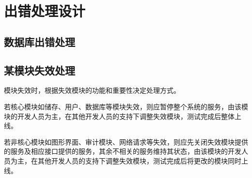\chapter{出错处理设计}
\section{数据库出错处理}

    

\section{某模块失效处理}
    模块失效时，根据失效模块的功能和重要性决定处理方式。

    若核心模块如储存、用户、数据库等模块失效，则应暂停整个系统的服务，由该模块的开发人员为主，在其他开发人员的支持下调整失效模块，测试完成后整体上线。

    若非核心模块如图形界面、审计模块、网络请求等失效，则应先关闭失效模块提供的服务及相应接口提供的服务，其余不相关的服务维持其状态，由该模块的开发人员为主，在其他开发人员的支持下调整失效模块，测试完成后将更改的模块同时上线。